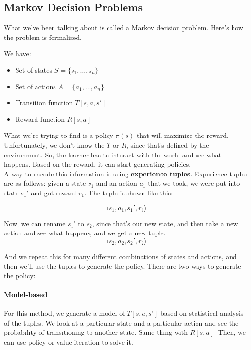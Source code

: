 \subsection{Markov Decision Problems}
\noindent What we've been talking about is called a Markov decision problem. Here's how the problem is formalized.

We have:
\begin{itemize}
\item Set of states $S = \{s_1, \ldots, s_n\}$
\item Set of actions $A = \{a_1, \ldots, a_n\}$
\item Transition function $T[s,a,s']$
\item Reward function $R[s,a]$
\end{itemize}

\noindent What we're trying to find is a policy $\pi(s)$ that will maximize the reward. Unfortunately, we don't know the $T$ or $R$, since that's defined by the environment. So, the learner has to interact with the world and see what happens. Based on the reward, it can start generating policies.\\

\noindent A way to encode this information is using \textbf{experience tuples}. Experience tuples are as follows: given a state $s_1$ and an action $a_1$ that we took, we were put into state $s_1'$ and got reward $r_1$. The tuple is shown like this:

\begin{equation*}
\langle s_1, a_1, {s_1}', r_1 \rangle
\end{equation*}

\noindent Now, we can rename ${s_1}'$ to $s_2$, since that's our new state, and then take a new action and see what happens, and we get a new tuple:
\begin{equation*}
\langle s_2, a_2, {s_2}', r_2 \rangle
\end{equation*}

\noindent And we repeat this for many different combinations of states and actions, and then we'll use the tuples to generate the policy. There are two ways to generate the policy:

\paragraph{Model-based} For this method, we generate a model of $T[s,a,s']$ based on statistical analysis of the tuples. We look at a particular state and a particular action and see the probability of transitioning to another state. Same thing with $R[s,a]$. Then, we can use policy or value iteration to solve it.

